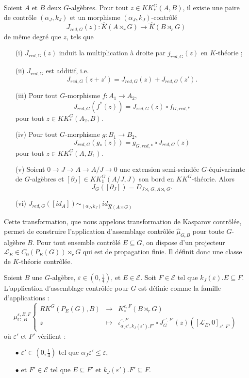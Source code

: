 \begin{propfr}
Soient $A$ et $B$ deux $G$-algèbres. Pour tout $z\in KK^G_*(A,B)$, il existe une paire de contrôle $(\alpha_J,k_J)$ et un morphisme $(\alpha_J,k_J)$-contrôlé
\[J_{red,G}(z) : \hat K(A\rtimes_r G)\rightarrow \hat K(B\rtimes_r G)\]
de même degré que $z$, tels que
\begin{enumerate}
\item[(i)] $J_{red,G}(z)$ induit la multiplication à droite par $j_{red,G}(z)$ en $K$-théorie ;
\item[(ii)] $J_{red,G}$ est additif, i.e.
\[J_{red,G}(z+z')=J_{red,G}(z)+J_{red,G}(z').\]
\item[(iii)] Pour tout $G$-morphisme $f : A_1\rightarrow A_2$,
\[J_{red,G}(f^*(z))=J_{red,G}(z)\circ f_{G,red,*}\] pour tout $z\in KK_*^G(A_2,B)$.
\item[(iv)] Pour tout $G$-morphisme $g : B_1\rightarrow B_2$,
\[J_{red,G}(g_*(z))= g_{G,red,*}\circ J_{red,G}(z)\] pour tout $z\in KK_*^G(A,B_1)$.
\item[(v)] Soient $0\rightarrow J\rightarrow A\rightarrow A/J\rightarrow 0$ une extension semi-scindée $G$-équivariante de $G$-algèbres et  $[\partial_J]\in KK_1^G(A/J,J)$ son bord en $KK^G$-théorie. Alors 
\[J_G([\partial_J])=D_{J\rtimes_r G,A\rtimes_rG}.\] 
\item[(vi)] $J_{red,G}([id_A]) \sim_{(\alpha_J,k_J)} id_{\hat K(A\rtimes G)}$
\end{enumerate}
\end{propfr}

Cette transformation, que nous appelons transformation de Kasparov contrôlée, permet de construire l'application d'assemblage contrôlée $\hat\mu_{G,B}$ pour toute $G$-algèbre $B$. Pour tout ensemble contrôlé $E\subseteq G$, on dispose d'un projecteur $\mathcal L_E\in C_0(P_E(G))\rtimes_r G$ qui est de propagation finie. Il définit donc une classe de $K$-théorie contrôlée.

\begin{definitionfr}
Soient $B$ une $G$-algèbre, $\varepsilon\in (0,\frac{1}{4})$, et $E\in\mathcal E$. Soit $F\in \mathcal E$ tel que $k_J(\varepsilon).E \subseteq F$. L'application d'assemblage contrôlée pour $G$ est définie comme la famille d'applications :
\[\mu_{G,B}^{\varepsilon,E,F}\left\{
\begin{array}{rcl}
RK^G(P_E(G), B) & \rightarrow & K_*^{\varepsilon, F}(B\rtimes_r G)\\
z & \mapsto & \iota_{\alpha_J\varepsilon', k_J(\varepsilon').F'}^{\varepsilon,F} \circ J_G^{\varepsilon', F'}(z)([\mathcal L_E,0]_{\varepsilon' , F'})
\end{array}\right.\]
où $\varepsilon'$ et $F'$ vérifient :
\begin{itemize}
\item[$\bullet$] $\varepsilon'\in (0,\frac{1}{4})$ tel que $\alpha_J \varepsilon'\leq \varepsilon$,
\item[$\bullet$] et $F'\in\mathcal E$ tel que $E\subseteq F'$ et $k_J(\varepsilon').F'\subseteq F$.
\end{itemize}
\end{definitionfr}

